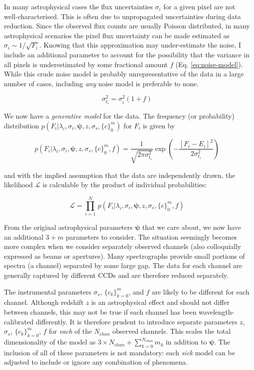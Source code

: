 \documentclass{aastex}
\newcommand{\sick}{\textit{sick}}
\begin{document}
In many astrophysical cases the flux uncertainties $\sigma_{i}$ for a given pixel are not well-characterised. This is often due to unpropagated uncertainties during data reduction. Since the observed flux counts are usually Poisson distributed, in many astrophysical scenarios the pixel flux uncertainty can be made estimated as $\sigma_i \sim 1/\sqrt{F_{i}}$. Knowing that this approximation may under-estimate the noise, I include an additional parameter to account for the possibility that the variance in all pixels is underestimated by some fractional amount $f$ (Eq. \ref{eq:noise-model}). While this crude noise model is probably unrepresentative of the data in a large number of cases, including \textit{any} noise model is preferable to none.

\begin{equation}
\sigma_{t_i}^2 = \sigma_{i}^2(1 + f)
\label{eq:noise-model}
\end{equation}

We now have a \textit{generative model} for the data. The frequency (or probability) distribution ${p\left(F_i|\lambda_i,\sigma_i,\bm{\psi},z,\sigma_s,\{c\}_{0}^{m}\right)}$ for $F_i$ is given by

\begin{equation}
p\left(F_i|\lambda_i,\sigma_{i},\bm{\psi},z,\sigma_{s},\{c\}_{0}^{m},f\right) = 
 \frac{1}{\sqrt{2\pi\sigma_{t_i}^2}}\exp{\left(-\frac{\left[F_i - E_i\right]^2}{2\sigma_{t_i}^2}\right)}
 \label{eq:p_model}
\end{equation}

\noindent{}and with the implied assumption that the data are independently drawn, the likelihood $\mathcal{L}$ is calculable by the product of individual probabilities:

\begin{equation}
\mathcal{L} = \prod_{i=1}^{N}\,p\left(F_i|\lambda_i,\sigma_{i},\bm{\psi},z,\sigma_{s},\{c\}_{0}^{m},f\right)
\end{equation}

From the original astrophysical parameters $\bm{\psi}$ that we care about, we now have an additional $3 + m$ parameters to consider. The situation seemingly becomes more complex when we consider separately observed channels (also colloquially expressed as beams or apertures). Many spectrographs provide small portions of spectra (a channel) separated by some large gap. The data for each channel are generally captured by different CCDs and are therefore reduced separately. 

The instrumental parameters $\sigma_{s}$, $\{c_k\}_{k=0}^{m}$, and $f$ are likely to be different for each channel. Although redshift $z$ is an astrophysical effect and should not differ between channels, this may not be true if each channel has been wavelength-calibrated differently. It is therefore prudent to introduce separate parameters $z$, $\sigma_{s}$, $\{c_k\}_{k=0}^{m}$, $f$ for \textit{each} of the $N_{chan}$ observed channels. This scales the total dimensionality of the model as $3\times{}N_{chan} + \sum_{k=0}^{N_{chan}}m_{k}$ in addition to $\bm{\psi}$. The inclusion of all of these parameters is not mandatory: each \sick{} model can be adjusted to include or ignore any combination of phenomena. 
\end{document}
